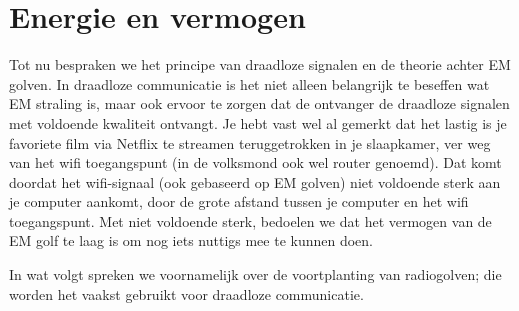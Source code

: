 
\section{Energie en vermogen}


Tot nu bespraken we het principe van draadloze signalen en de theorie achter EM golven. In draadloze communicatie is het niet alleen belangrijk te beseffen wat EM straling is, maar ook ervoor te zorgen dat de ontvanger de draadloze signalen met voldoende kwaliteit ontvangt. Je hebt vast wel al gemerkt dat het lastig is je favoriete film via Netflix te streamen teruggetrokken in je slaapkamer, ver weg van het wifi toegangspunt (in de volksmond ook wel router genoemd). Dat komt doordat het wifi-signaal (ook gebaseerd op EM golven) niet voldoende sterk aan je computer aankomt, door de grote afstand tussen je computer en het wifi toegangspunt. Met niet voldoende sterk, bedoelen we dat het vermogen van de EM golf te laag is om nog iets nuttigs mee te kunnen doen. 

In wat volgt spreken we voornamelijk over de voortplanting van radiogolven; die worden het vaakst gebruikt voor draadloze communicatie.

